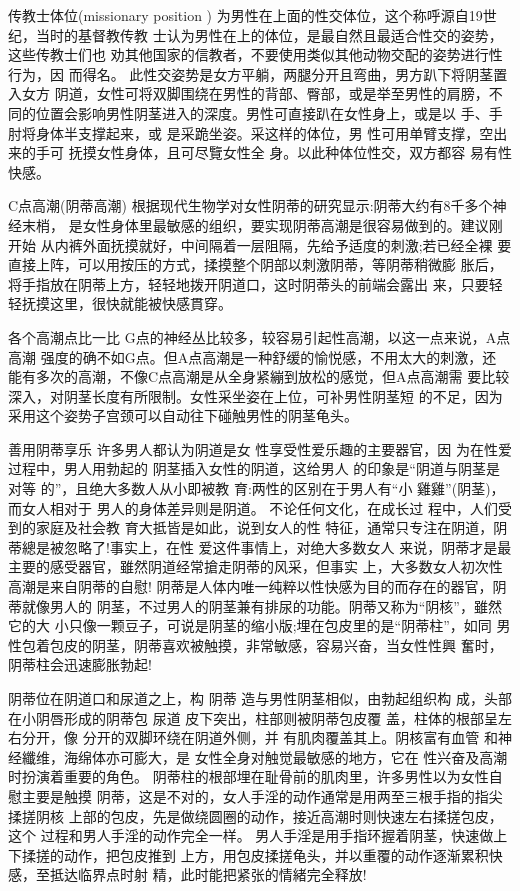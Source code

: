 \documentclass[12pt,UTF8]{ctexbook}
\begin{document}
传教士体位(missionary position )
为男性在上面的性交体位，这个称呼源自19世纪，当时的基督教传教
士认为男性在上的体位，是最自然且最适合性交的姿势，这些传教士们也
劝其他国家的信教者，不要使用类似其他动物交配的姿势进行性行为，因
而得名。
此性交姿势是女方平躺，两腿分开且弯曲，男方趴下将阴茎置入女方
阴道，女性可将双脚围绕在男性的背部、臀部，或是举至男性的肩膀，不
同的位置会影响男性阴茎进入的深度。男性可直接趴在女性身上，或是以
手、手肘将身体半支撑起来，或
是采跪坐姿。采这样的体位，男
性可用单臂支撑，空出来的手可
抚摸女性身体，且可尽覽女性全
身。以此种体位性交，双方都容
易有性快感。

C点高潮(阴蒂高潮)
根据现代生物学对女性阴蒂的研究显示:阴蒂大约有8千多个神经末梢，
是女性身体里最敏感的组织，要实现阴蒂高潮是很容易做到的。建议刚开始
从内裤外面抚摸就好，中间隔着一层阻隔，先给予适度的刺激;若已经全裸
要直接上阵，可以用按压的方式，揉摸整个阴部以刺激阴蒂，等阴蒂稍微膨
胀后，将手指放在阴蒂上方，轻轻地拨开阴道口，这时阴蒂头的前端会露出
来，只要轻轻抚摸这里，很快就能被快感貫穿。

各个高潮点比一比
G点的神经丛比较多，较容易引起性高潮，以这一点来说，A点高潮
强度的确不如G点。但A点高潮是一种舒缓的愉悦感，不用太大的刺激，还
能有多次的高潮，不像C点高潮是从全身紧繃到放松的感觉，但A点高潮需
要比较深入，对阴茎长度有所限制。女性采坐姿在上位，可补男性阴茎短
的不足，因为采用这个姿势子宫颈可以自动往下碰触男性的阴茎龟头。

善用阴蒂享乐
许多男人都认为阴道是女
性享受性爱乐趣的主要器官，因
为在性爱过程中，男人用勃起的
阴茎插入女性的阴道，这给男人
的印象是“阴道与阴茎是对等
的”，且绝大多数人从小即被教
育:两性的区别在于男人有“小
雞雞”(阴茎)，而女人相对于
男人的身体差异则是阴道。
不论任何文化，在成长过
程中，人们受到的家庭及社会教
育大抵皆是如此，说到女人的性
特征，通常只专注在阴道，阴蒂總是被忽略了!事实上，在性
爱这件事情上，对绝大多数女人
来说，阴蒂才是最主要的感受器官，雖然阴道经常搶走阴蒂的风采，但事实
上，大多数女人初次性高潮是来自阴蒂的自慰!
阴蒂是人体内唯一纯粹以性快感为目的而存在的器官，阴蒂就像男人的
阴茎，不过男人的阴茎兼有排尿的功能。阴蒂又称为“阴核”，雖然它的大
小只像一颗豆子，可说是阴茎的缩小版;埋在包皮里的是“阴蒂柱”，如同
男性包着包皮的阴茎，阴蒂喜欢被触摸，非常敏感，容易兴奋，当女性性興
奮时，阴蒂柱会迅速膨胀勃起!

阴蒂位在阴道口和尿道之上，构
阴蒂
造与男性阴茎相似，由勃起组织构
成，头部在小阴唇形成的阴蒂包
尿道
皮下突出，柱部则被阴蒂包皮覆
盖，柱体的根部呈左右分开，像
分开的双脚环绕在阴道外侧，并
有肌肉覆盖其上。阴核富有血管
和神经纖维，海绵体亦可膨大，是
女性全身对触觉最敏感的地方，它在
性兴奋及高潮时扮演着重要的角色。
阴蒂柱的根部埋在耻骨前的肌肉里，许多男性以为女性自慰主要是触摸
阴蒂，这是不对的，女人手淫的动作通常是用两至三根手指的指尖揉搓阴核
上部的包皮，先是做绕圆圈的动作，接近高潮时则快速左右揉搓包皮，这个
过程和男人手淫的动作完全一样。
男人手淫是用手指环握着阴茎，快速做上下揉搓的动作，把包皮推到
上方，用包皮揉搓龟头，并以重覆的动作逐渐累积快感，至抵达临界点时射
精，此时能把紧张的情緒完全释放!
\end{document}
